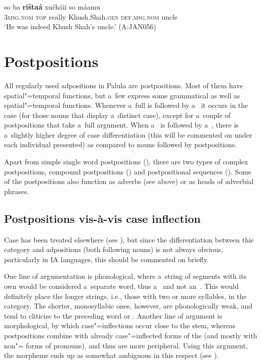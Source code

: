 \begin{exe}
\ex
\label{ex:7-48b}
\gll so ba \textbf{rištaá} xučháii so máamu \\
\textsc{3msg.nom} \textsc{top} really Khush.Shah.\textsc{gen} \textsc{def.msg.nom} uncle \\
\glt `He was indeed Khush Shah's uncle.' (A:JAN056)
\end{exe}

\section{Postpositions}
\label{sec:7-2}

All regularly used adpositions in Palula are postpositions. Most of them have spatial"=temporal functions, but a~few express some grammatical as well as spatial"=temporal functions. Whenever a~full  is followed by a~ it occurs in the  case (for those nouns that display a~distinct  case), except for a~couple of postpositions that take a~full   argument. When a~ is followed by a~, there is a~slightly higher degree of case differentiation (this will be commented on under each individual  presented) as compared to nouns followed by postpositions.


Apart from simple single word postpositions (), there are two types of complex postpositions, compound postpositions () and postpositional sequences (). Some of the postpositions also function as adverbs (see above) or as heads of adverbial phrases. 


\subsection{Postpositions vis-à-vis case inflection}
\label{subsec:7-2-1}


Case  has been treated elsewhere (see ), but since the differentiation between this category and adpositions (both following nouns) is not always obvious, particularly in IA languages, this should be commented on briefly. 


One line of argumentation is phonological, where a~string of segments with its own  would be considered a~separate word, thus a~ and not an~. This would definitely place the longer strings, i.e., those with two or more syllables, in the  category. The shorter, monosyllabic ones, however, are phonologically weak, and tend to cliticise to the preceding  word or . Another line of argument is morphological, by which case"=inflections occur close to the stem, whereas postpositions combine with already case"=inflected forms of the  (and mostly with non"= forms of pronouns), and thus are more peripheral. Using this argument, the  morpheme ends up as somewhat ambiguous in this respect (see ).


